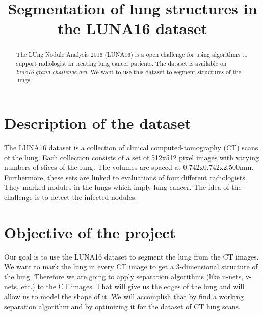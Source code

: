 \documentclass[conference]{IEEEtran}
\begin{document}
\title{Segmentation of lung structures in the LUNA16 dataset}

\author{
	\and
	\and
	\and
	}



\maketitle

\begin{abstract}
	The LUng Nodule Analysis 2016 (LUNA16) is a open challenge for using algorithms to support radiologist in treating lung cancer patients. The dataset is available on \textit{luna16.grand-challenge.org}. We want to use this dataset to segment structures of the lungs.
\end{abstract}

\section{Description of the dataset}
The LUNA16 dataset is a collection of clinical computed-tomography (CT) scans of the lung. Each collection consists of a set of 512x512 pixel images with varying numbers of slices of the lung. The volumes are spaced at 0.742x0.742x2.500mm. Furthermore, these sets are linked to evaluations of four different radiologists. They marked nodules in the lungs which imply lung cancer. The idea of the challenge is to detect the infected nodules.

\section{Objective of the project}
Our goal is to use the LUNA16 dataset to segment the lung from the CT images. We want to mark the lung in every CT image to get a 3-dimensional structure of the lung. Therefore we are going to apply separation algorithms (like u-nets, v-nets, etc.) to the CT images. That will give us the edges of the lung and will allow us to model the shape of it.\newline
We will accomplish that by find a working separation algorithm and by optimizing it for the dataset of CT lung scans. 
\end{document}
